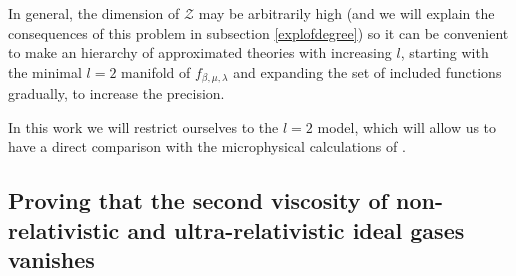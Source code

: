 \documentclass[useAMS,usenatbib,prd,twocolumn,nofootinbib]{revtex4-1}
\begin{document}
In general, the dimension of $\mathcal{Z}$ may be arbitrarily high (and we will explain the consequences of this problem in subsection \ref{explofdegree}) so it can be convenient to make an hierarchy of approximated theories with increasing $l$, starting with the minimal $l=2$ manifold of $f_{\beta,\mu,\lambda}$ and expanding the set of included functions gradually, to increase the precision. 

In this work we will restrict ourselves to the  $l=2$ model, which will allow us to have a direct comparison with the microphysical calculations of \citet{Israel_Stewart_1979}.




\subsection{Proving that the second viscosity of non-relativistic and ultra-relativistic ideal gases vanishes}\label{PTTSVONRAURGV}
\end{document}
